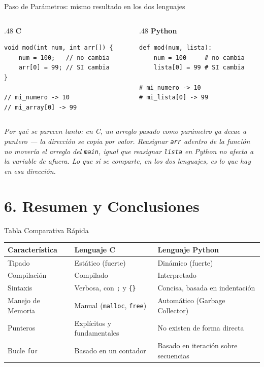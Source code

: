 \documentclass{beamer}
\begin{document}
\begin{frame}[fragile]{Paso de Parámetros: mismo resultado en los dos lenguajes}
  \begin{columns}[T]
    \begin{column}{.48\textwidth}
      \centering\textbf{C}
      \begin{verbatim}
void mod(int num, int arr[]) {
    num = 100;   // no cambia
    arr[0] = 99; // SI cambia
}

// mi_numero -> 10
// mi_array[0] -> 99
      \end{verbatim}
    \end{column}
    \begin{column}{.48\textwidth}
      \centering\textbf{Python}
      \begin{verbatim}
def mod(num, lista):
    num = 100     # no cambia
    lista[0] = 99 # SI cambia

# mi_numero -> 10
# mi_lista[0] -> 99
      \end{verbatim}
    \end{column}
  \end{columns}
  \vspace{0.4em}
  {\footnotesize \textit{Por qué se parecen tanto: en C, un arreglo pasado
  como parámetro ya decae a puntero — la \emph{dirección} se copia por
  valor. Reasignar \texttt{arr} adentro de la función no movería el
  arreglo del \texttt{main}, igual que reasignar \texttt{lista} en Python
  no afecta a la variable de afuera. Lo que sí se comparte, en los dos
  lenguajes, es lo que hay \emph{en} esa dirección.}}
\end{frame}

\section{6. Resumen y Conclusiones}

\begin{frame}{Tabla Comparativa Rápida}
  \begin{tabular}{|l|p{4cm}|p{4cm}|}
    \hline
    \textbf{Característica} & \textbf{Lenguaje C} & \textbf{Lenguaje Python} \\
    \hline \hline
    Tipado & Estático (fuerte) & Dinámico (fuerte) \\
    \hline
    Compilación & Compilado & Interpretado \\
    \hline
    Sintaxis & Verbosa, con \texttt{;} y \texttt{\{\}} & Concisa, basada en indentación \\
    \hline
    Manejo de Memoria & Manual (\texttt{malloc}, \texttt{free}) & Automático (Garbage Collector) \\
    \hline
    Punteros & Explícitos y fundamentales & No existen de forma directa \\
    \hline
    Bucle \texttt{for} & Basado en un contador & Basado en iteración sobre secuencias \\
    \hline
  \end{tabular}
\end{frame}
\end{document}

